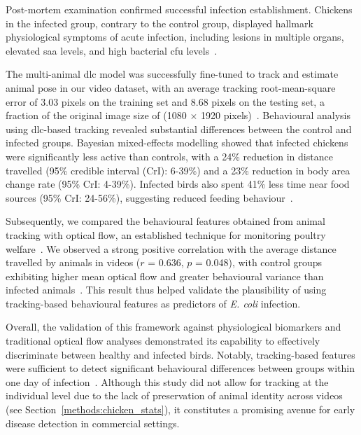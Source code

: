 Post-mortem examination confirmed successful infection establishment. Chickens in the infected group, contrary to the control group, displayed hallmark physiological symptoms of acute infection, including lesions in multiple organs, elevated \gls{saa} levels, and high bacterial \gls{cfu} levels~\cite{scheidwasser2025c}.

The multi-animal \gls{dlc} model was successfully fine-tuned to track and estimate animal pose in our video dataset, with an average tracking root-mean-square error of 3.03 pixels on the training set and 8.68 pixels on the testing set, a fraction of the original image size of (1080 $\times$ 1920 pixels)~\cite{scheidwasser2025c}. Behavioural analysis using \gls{dlc}-based tracking revealed substantial differences between the control and infected groups. Bayesian mixed-effects modelling showed that infected chickens were significantly less active than controls, with a 24\% reduction in distance travelled (95\% credible interval (CrI): 6-39\%) and a 23\% reduction in body area change rate (95\% CrI: 4-39\%). Infected birds also spent 41\% less time near food sources (95\% CrI: 24-56\%), suggesting reduced feeding behaviour~\cite{scheidwasser2025c}.

Subsequently, we compared the behavioural features obtained from animal tracking with optical flow, an established technique for monitoring poultry welfare~\cite{dawkins2009, dawkins2012, colles2016, dawkins2017}. We observed a strong positive correlation with the average distance travelled by animals in videos ($r$ = 0.636, $p$ = 0.048), with control groups exhibiting higher mean optical flow and greater behavioural variance than infected animals~\cite{scheidwasser2025c}. This result thus helped validate the plausibility of using tracking-based behavioural features as predictors of \textit{E. coli} infection.

Overall, the validation of this framework against physiological biomarkers and traditional optical flow analyses demonstrated its capability to effectively discriminate between healthy and infected birds. Notably, tracking-based features were sufficient to detect significant behavioural differences between groups within one day of infection~\cite{scheidwasser2025c}. Although this study did not allow for tracking at the individual level due to the lack of preservation of animal identity across videos (see Section~\ref{methods:chicken_stats}), it constitutes a promising avenue for early disease detection in commercial settings.

